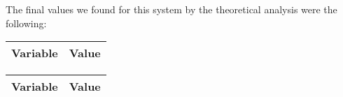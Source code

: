 The final values we found for this system by the theoretical analysis were the following:

\begin{tabular}{|l|r|}
	\hline    
    {\bf Variable} & {\bf Value} \\ \hline %
    
\end{tabular}

\begin{tabular}{|l|r|}
    \hline    
    {\bf Variable} & {\bf Value} \\ \hline %
    
\end{tabular}


